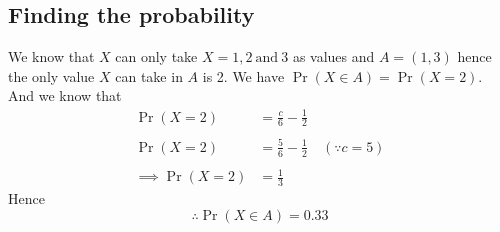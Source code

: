 \documentclass[journal,12pt,twocolumn]{IEEEtran}
\providecommand{\brak}[1]{\ensuremath{\left(#1\right)}}
\begin{document}
\subsection{Finding the probability }
 We know that $X$ can only take $X =1,2 \: \text{and}\: 3 $ as values and $A = \brak{1,3} $ hence the only value $X$ can take in $A$ is 2. We have $\Pr\brak{X\in A} = \Pr\brak{X = 2}$. And we know that  
\begin{align}
 \Pr\brak{X =2 } &= \frac{c}{6} - \frac{1}{2}\\
\nonumber \\
 \Pr\brak{X =2 } &= \frac{5}{6} - \frac{1}{2} \quad \brak{\because c =5}\\
\nonumber \\
 \implies \Pr\brak{X = 2} &= \frac{1}{3}
\end{align}
Hence \\$$\therefore \Pr\brak{X \in A} = 0.33$$
\end{document}
